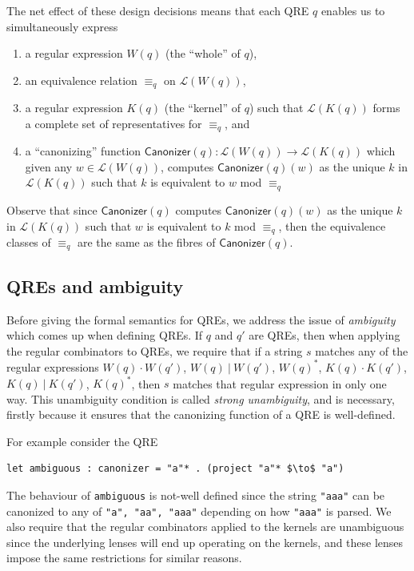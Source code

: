 \documentclass{svproc}
\newcommand{\cd}[1]{\lstinline[backgroundcolor=\color{white}]$#1$}
\newcommand{\kw}[1]{\ensuremath{\mathsf{#1}}}
\newcommand{\sep}{\ensuremath{\ | \ }}
\newcommand{\canonizer}{\ensuremath{\kw{Canonizer}}}
\newcommand{\eqrel}[1]{\ensuremath{\equiv_{#1}}}
\begin{document}
The net effect of these design decisions means that each QRE $q$ enables us to
simultaneously express
\begin{enumerate}
  \item a regular expression $W(q)$ (the ``whole'' of $q$),
  \item an equivalence relation $\eqrel{q}$ on $\mathcal{L}(W(q))$,
  \item a regular expression $K(q)$ (the ``kernel'' of $q$)
  such that $\mathcal{L}(K(q))$ forms a complete set of representatives for
  $\eqrel{q}$, and
  \item a ``canonizing'' function $\canonizer(q):\mathcal{L}(W(q))
  \longrightarrow \mathcal{L}(K(q))$ which given any $w \in \mathcal{L}(W(q))$,
  computes $\canonizer(q)(w)$ as the unique $k$ in $\mathcal{L}(K(q))$ such that
  $k$ is equivalent to $w$ mod $\eqrel{q}$
  \end{enumerate}
  Observe that since $\canonizer(q)$ computes $\canonizer(q)(w)$ as the unique
  $k$ in $\mathcal{L}(K(q))$ such that $w$ is equivalent to $k$ mod $\eqrel{q}$,
  then the equivalence classes of $\eqrel{q}$ are the same as the fibres of
  $\canonizer(q)$.

\subsection{QREs and ambiguity}
Before giving the formal semantics for QREs, we address the issue of {\em
ambiguity} which comes up when defining QREs. If $q$ and  $q'$ are QREs, then
when applying the regular combinators to QREs, we require that if a string $s$
matches any of the regular expressions $W(q) \cdot W(q')$, $W(q) \sep W(q')$,
$W(q)^*$, $K(q) \cdot K(q')$, $K(q) \sep K(q')$, $K(q)^*$, then $s$ matches
that regular expression in only one way. This unambiguity condition is called
{\em strong unambiguity}, and is necessary, firstly because it ensures that the
canonizing function of a QRE is well-defined.

For example consider the QRE

\begin{lstlisting}
let ambiguous : canonizer = "a"* . (project "a"* $\to$ "a")
\end{lstlisting}

\noindent The behaviour of \cd{ambiguous} is not-well defined since the string
\cd{"aaa"} can be canonized to any of \cd{"a", "aa", "aaa"} depending on how
\cd{"aaa"} is parsed. We also require that the regular combinators applied to
the kernels are unambiguous since the underlying lenses will end up operating
on the kernels, and these lenses impose the same restrictions for similar
reasons.
\end{document}
